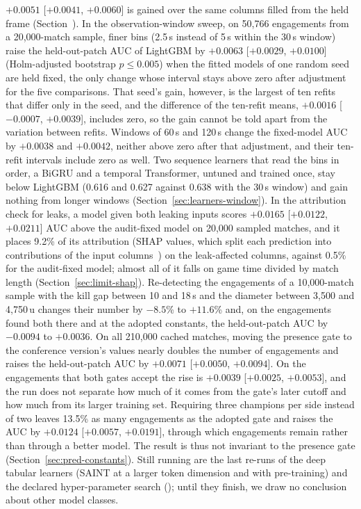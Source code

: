 $+0.0051$ [$+0.0041$, $+0.0060$] is gained over the same columns filled from the held frame
(Section~). In the observation-window sweep, on 50,766 engagements from a
20,000-match sample, finer bins (2.5\,s instead of 5\,s within the 30\,s window) raise the
held-out-patch AUC of LightGBM by $+0.0063$ [$+0.0029$, $+0.0100$] (Holm-adjusted bootstrap
$p \le 0.005$) when the fitted models of one random seed are held fixed, the only change whose interval
stays above zero after adjustment for the five comparisons. That seed's gain, however, is the largest of
ten refits that differ only in the seed, and the difference of the ten-refit means, $+0.0016$
[$-0.0007$, $+0.0039$], includes zero, so the gain cannot be told apart from the variation between
refits. Windows of 60\,s and 120\,s change the fixed-model AUC by $+0.0038$ and $+0.0042$, neither above
zero after that adjustment, and their ten-refit intervals include zero as well. Two sequence learners that read the bins in order, a BiGRU and a temporal Transformer,
untuned and trained once, stay below LightGBM (0.616 and 0.627 against 0.638 with the 30\,s window)
and gain nothing from longer windows (Section~\ref{sec:learners-window}). In the attribution check for
leaks, a model given both leaking inputs scores $+0.0165$ [$+0.0122$, $+0.0211$] AUC above the
audit-fixed model on 20,000 sampled matches, and it places 9.2\% of its attribution (SHAP values, which
split each prediction into contributions of the input columns~\cite{lundberg2020local}) on the
leak-affected columns, against 0.5\% for the audit-fixed model; almost all of it falls on game time
divided by match length (Section~\ref{sec:limit-shap}). Re-detecting the engagements of a
10,000-match sample with the kill gap between 10 and 18\,s and the diameter between 3,500 and
4,750\,u changes their number by $-8.5$\% to $+11.6$\% and, on the engagements found both there and at
the adopted constants, the held-out-patch AUC by $-0.0094$ to $+0.0036$. On all 210,000 cached matches,
moving the presence gate to the conference version's values nearly doubles the number of engagements and
raises the held-out-patch AUC by $+0.0071$ [$+0.0050$, $+0.0094$]. On the engagements that both gates
accept the rise is $+0.0039$ [$+0.0025$, $+0.0053$], and the run does not separate how much of it comes
from the gate's later cutoff and how much from its larger training set. Requiring three champions per side
instead of two leaves 13.5\% as many engagements as the adopted gate and raises the AUC by $+0.0124$
[$+0.0057$, $+0.0191$], through which engagements remain rather than through a better model. The result
is thus not invariant to the presence gate
(Section~\ref{sec:pred-constants}).
Still running are the last re-runs of the deep tabular learners (SAINT at a larger token dimension and
with pre-training) and the declared hyper-parameter search (); until they finish, we draw no conclusion about other model classes.

